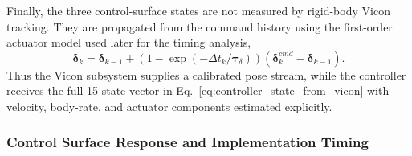 Finally, the three control-surface states are not measured by rigid-body Vicon
tracking. They are propagated from the command history using the first-order
actuator model used later for the timing analysis,
\begin{equation}
    \boldsymbol{\delta}_k
    =
    \boldsymbol{\delta}_{k-1}
    +
    \left(
    1-\exp\left(-\Delta t_k/\boldsymbol{\tau}_{\delta}\right)
    \right)
    \left(
    \boldsymbol{\delta}^{cmd}_k-\boldsymbol{\delta}_{k-1}
    \right).
    \label{eq:vicon_actuator_state}
\end{equation}
Thus the Vicon subsystem supplies a calibrated pose stream, while the controller
receives the full 15-state vector in Eq.~\eqref{eq:controller_state_from_vicon}
with velocity, body-rate, and actuator components estimated explicitly.

\subsubsection{Control Surface Response and Implementation Timing}\label{sec:3.3.2}

\vspace{-8pt}

